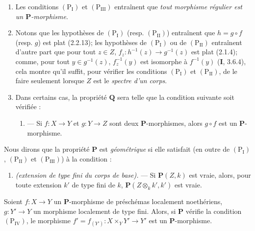 \begin{remarks}[7.3.5]
\label{IV.2.s7.3.5-fr}
\begin{enumerate}
\item[(i)] Les conditions $(\mathrm P_{\mathrm I})$ et
$(\mathrm P_{\mathrm{III}})$ entraînent que \emph{tout morphisme régulier
est un $\boldsymbol P$-morphisme}.
\item[(ii)] Notons que les hypothèses de $(\mathrm P_{\mathrm I})$
(resp. $(\mathrm P_{\mathrm{II}})$) entraînent que $h=g\circ f$ (resp.
$g$) est plat (2.2.13); les hypothèses de $(\mathrm P_{\mathrm I})$ ou de
$(\mathrm P_{\mathrm{II}})$ entraînent d'autre part que pour tout
$z\in Z$, $f_z:h^{-1}(z)\to g^{-1}(z)$ est plat (2.1.4); comme, pour tout
$y\in g^{-1}(z)$, $f_z^{-1}(y)$ est isomorphe à $f^{-1}(y)$ (\textbf{I}, 3.6.4),
cela montre qu'il suffit, pour vérifier les conditions
$(\mathrm P_{\mathrm I})$ et $(\mathrm P_{\mathrm{II}})$, de le faire
seulement lorsque $Z$ est le \emph{spectre d'un corps}.
\item[(iii)] Dans certains cas, la propriété $\boldsymbol Q$ sera telle que la
condition suivante soit vérifiée :
\begin{enumerate}
\item[$(\mathrm P'_{\mathrm I})$.] --- Si $f:X\to Y$ et $g:Y\to Z$ sont
deux $\boldsymbol P$-morphismes, alors $g\circ f$ est un
$\boldsymbol P$-morphisme.
\end{enumerate}
\end{enumerate}
\end{remarks}


\begin{env}[7.3.6]
\label{IV.2.s7.3.6-fr}
Nous dirons que la propriété $\boldsymbol P$ est \emph{géométrique} si elle
satisfait (en outre de $(\mathrm P_{\mathrm I})$,
$(\mathrm P_{\mathrm{II}})$ et $(\mathrm P_{\mathrm{III}})$) à la
condition :
\begin{enumerate}
\item[$(\mathrm P_{\mathrm{IV}})$] \emph{(extension de type fini du corps
de base).} --- Si $\boldsymbol P(Z,k)$ est vraie, alors, pour toute
extension $k'$ de type fini de $k$,
$\boldsymbol P(Z\otimes_k k',k')$ est vraie.
\end{enumerate}
\end{env}

\begin{lemma}[7.3.7]
\label{IV.2.s7.3.7-fr}
Soient $f:X\to Y$ un $\boldsymbol P$-morphisme de préschémas localement
noethériens, $g:Y'\to Y$ un morphisme localement de type fini. Alors, si
$\boldsymbol P$ vérifie la condition $(\mathrm P_{\mathrm{IV}})$, le
morphisme $f'=f_{(Y')}:X\times_Y Y'\to Y'$ est un
$\boldsymbol P$-morphisme.
\end{lemma}

